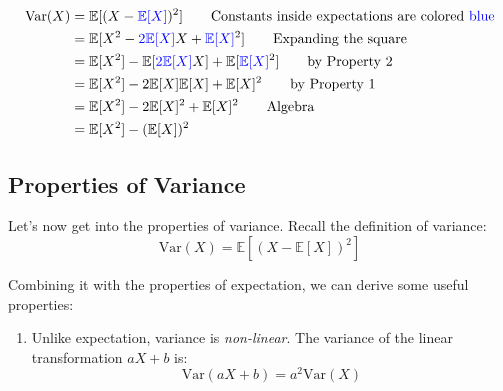 \documentclass[
  letterpaper,
  DIV=11,
  numbers=noendperiod]{scrreprt}
\providecommand{\tightlist}{%
  \setlength{\itemsep}{0pt}\setlength{\parskip}{0pt}}\usepackage{longtable,booktabs,array}
\begin{document}
\begin{tcolorbox}[enhanced jigsaw, colback=white, arc=.35mm, toprule=.15mm, colframe=quarto-callout-tip-color-frame, coltitle=black, opacitybacktitle=0.6, breakable, titlerule=0mm, leftrule=.75mm, left=2mm, opacityback=0, bottomtitle=1mm, rightrule=.15mm, colbacktitle=quarto-callout-tip-color!10!white, bottomrule=.15mm, title=\textcolor{quarto-callout-tip-color}{\faLightbulb}\hspace{0.5em}{Proof}, toptitle=1mm]

\[\begin{align}
   \text{Var}(X) &= \mathbb{E}[(X-\textcolor{blue}{\mathbb{E}[X]})^2] \hspace{2em} \text{Constants inside expectations are colored \textcolor{blue}{blue}} \\
   &= \mathbb{E}[X^2 - \textcolor{blue}{2\mathbb{E}[X]}X + \textcolor{blue}{\mathbb{E}[X]}^2] \hspace{2em} \text{Expanding the square}\\
   &= \mathbb{E}[X^2] - \mathbb{E}[\textcolor{blue}{2\mathbb{E}[X]}X] +\mathbb{E}[\textcolor{blue}{\mathbb{E}[X]}^2] \hspace{2em} \text{by Property 2}\\
   &= \mathbb{E}[X^2] - 2 \mathbb{E}[X]\mathbb{E}[X] +\mathbb{E}[X]^2 \hspace{2em} \text{by Property 1}\\
   &= \mathbb{E}[X^2] - 2 \mathbb{E}[X]^2 +\mathbb{E}[X]^2 \hspace{2em} \text{Algebra}\\
   &= \mathbb{E}[X^2] - (\mathbb{E}[X])^2
\end{align}\]

\end{tcolorbox}

\subsection{Properties of Variance}\label{properties-of-variance}

Let's now get into the properties of variance. Recall the definition of
variance: \[\text{Var}(X) = \mathbb{E}[(X-\mathbb{E}[X])^2]\]

Combining it with the properties of expectation, we can derive some
useful properties:

\begin{enumerate}
\def\labelenumi{\arabic{enumi}.}
\tightlist
\item
  Unlike expectation, variance is \emph{non-linear}. The variance of the
  linear transformation \(aX+b\) is:
  \[\text{Var}(aX+b) = a^2 \text{Var}(X)\]
\end{enumerate}
\end{document}
